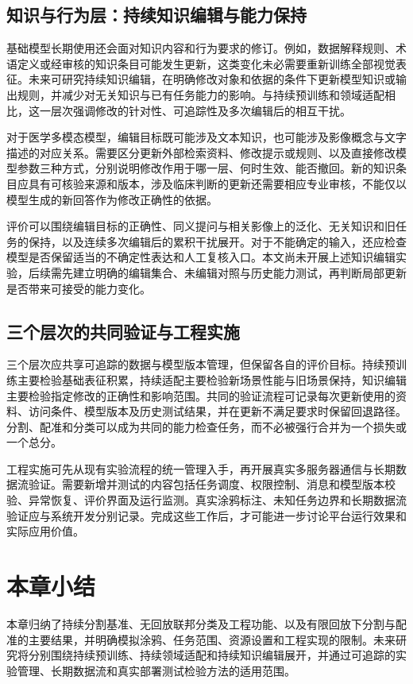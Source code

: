 \subsection{知识与行为层：持续知识编辑与能力保持}

基础模型长期使用还会面对知识内容和行为要求的修订。例如，数据解释规则、术语定义或经审核的知识条目可能发生更新，这类变化未必需要重新训练全部视觉表征。未来可研究持续知识编辑，在明确修改对象和依据的条件下更新模型知识或输出规则，并减少对无关知识与已有任务能力的影响。与持续预训练和领域适配相比，这一层次强调修改的针对性、可追踪性及多次编辑后的相互干扰。

对于医学多模态模型，编辑目标既可能涉及文本知识，也可能涉及影像概念与文字描述的对应关系。需要区分更新外部检索资料、修改提示或规则、以及直接修改模型参数三种方式，分别说明修改作用于哪一层、何时生效、能否撤回。新的知识条目应具有可核验来源和版本，涉及临床判断的更新还需要相应专业审核，不能仅以模型生成的新回答作为修改正确性的依据。

评价可以围绕编辑目标的正确性、同义提问与相关影像上的泛化、无关知识和旧任务的保持，以及连续多次编辑后的累积干扰展开。对于不能确定的输入，还应检查模型是否保留适当的不确定性表达和人工复核入口。本文尚未开展上述知识编辑实验，后续需先建立明确的编辑集合、未编辑对照与历史能力测试，再判断局部更新是否带来可接受的能力变化。

\subsection{三个层次的共同验证与工程实施}

三个层次应共享可追踪的数据与模型版本管理，但保留各自的评价目标。持续预训练主要检验基础表征积累，持续适配主要检验新场景性能与旧场景保持，知识编辑主要检验指定修改的正确性和影响范围。共同的验证流程可记录每次更新使用的资料、访问条件、模型版本及历史测试结果，并在更新不满足要求时保留回退路径。分割、配准和分类可以成为共同的能力检查任务，而不必被强行合并为一个损失或一个总分。

工程实施可先从现有实验流程的统一管理入手，再开展真实多服务器通信与长期数据流验证。需要新增并测试的内容包括任务调度、权限控制、消息和模型版本校验、异常恢复、评价界面及运行监测。真实涂鸦标注、未知任务边界和长期数据流验证应与系统开发分别记录。完成这些工作后，才可能进一步讨论平台运行效果和实际应用价值。

\section{本章小结}
\label{sec:conclusion-chapter-summary}

本章归纳了持续分割基准、无回放联邦分类及工程功能、以及有限回放下分割与配准的主要结果，并明确模拟涂鸦、任务范围、资源设置和工程实现的限制。未来研究将分别围绕持续预训练、持续领域适配和持续知识编辑展开，并通过可追踪的实验管理、长期数据流和真实部署测试检验方法的适用范围。
